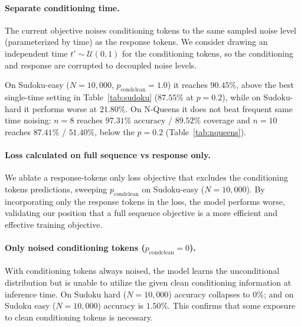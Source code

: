 \documentclass{article}
\begin{document}
\paragraph{Separate conditioning time.}
The current objective noises conditioning tokens to the same sampled noise level (parameterized by time) as the response tokens.
We consider drawing an independent time $t' \sim \mathcal{U}(0,1)$ for the conditioning tokens, so
the conditioning and response are corrupted to decoupled noise levels. 

On Sudoku-easy ($N{=}10{,}000$, $p_\text{condclean}{=}1.0$) it reaches
$90.45\%$, above the best single-time setting in Table~\ref{tab:sudoku} ($87.55\%$ at $p{=}0.2$),
while on Sudoku-hard it performs worse at $21.80\%$. On N-Queens it does not beat frequent same time
noising: $n{=}8$ reaches $97.31\%$ accuracy / $89.52\%$ coverage and $n{=}10$ reaches $87.41\%$ /
$51.40\%$, below the $p{=}0.2$ (Table~\ref{tab:nqueens}).

\paragraph{Loss calculated on full sequence vs response only.}
We ablate a response-tokens only loss objective that excludes the conditioning tokens predictions,
sweeping $p_\text{condclean}$ on Sudoku-easy ($N{=}10{,}000$). By incorporating only the response 
tokens in the loss, the model performs worse, validating our position 
that a full sequence objective is a more efficient and effective training objective. 

\paragraph{Only noised conditioning tokens ($p_\text{condclean}{=}0$).}
With conditioning tokens always noised, the model learns the unconditional distribution 
but is unable to utilize the given clean conditioning information at inference time. On Sudoku hard
 ($N{=}10{,}000$) accuracy collapses to $0\%$; and on Sudoku easy ($N{=}10{,}000$) accuracy is $1.50\%$.
This confirms that some exposure to clean conditioning tokens is necessary.
\end{document}
